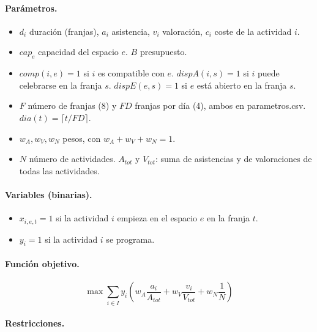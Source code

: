 \paragraph{Par\'ametros.}
\begin{itemize}[nosep]
\item $d_i$ duraci\'on (franjas), $a_i$ asistencia, $v_i$ valoraci\'on, $c_i$ coste de la actividad $i$.
\item $cap_e$ capacidad del espacio $e$. $B$ presupuesto.
\item $comp(i,e)=1$ si $i$ es compatible con $e$. $dispA(i,s)=1$ si $i$ puede celebrarse en la franja $s$. $dispE(e,s)=1$ si $e$ est\'a abierto en la franja $s$.
\item $F$ n\'umero de franjas (8) y $FD$ franjas por d\'ia (4), ambos en parametros.csv. $dia(t)=\lceil t/FD\rceil$.
\item $w_A,w_V,w_N$ pesos, con $w_A+w_V+w_N=1$.
\item $N$ n\'umero de actividades. $A_{tot}$ y $V_{tot}$: suma de asistencias y de valoraciones de todas las actividades.
\end{itemize}
\paragraph{Variables (binarias).}
\begin{itemize}[nosep]
\item $x_{i,e,t}=1$ si la actividad $i$ empieza en el espacio $e$ en la franja $t$.
\item $y_i=1$ si la actividad $i$ se programa.
\end{itemize}
\paragraph{Funci\'on objetivo.}
\[
\max \sum_{i \in I} y_i \left( w_A \frac{a_i}{A_{tot}} + w_V \frac{v_i}{V_{tot}} + w_N \frac{1}{N} \right)
\]
\paragraph{Restricciones.}

